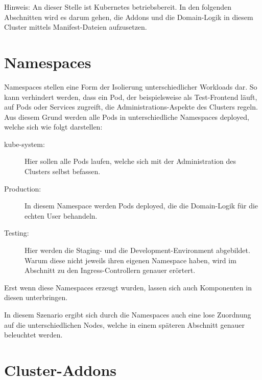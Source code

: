 \begin{tcolorbox}
  Hinweis: An dieser Stelle ist Kubernetes betriebsbereit.
  In den folgenden Abschnitten wird es darum gehen, die Addons und die
  Domain-Logik in diesem Cluster mittels Manifest-Dateien aufzusetzen.
\end{tcolorbox}

\section{Namespaces}

Namespaces stellen eine Form der Isolierung unterschiedlicher Workloads dar.
So kann verhindert werden, dass ein Pod, der beispielsweise als Test-Frontend läuft,
auf Pods oder Services zugreift, die Administrations-Aspekte des Clusters regeln.
Aus diesem Grund werden alle Pods in unterschiedliche Namespaces deployed, welche
sich wie folgt darstellen:

\begin{description}
  \item[kube-system:]
  Hier sollen alle Pods laufen, welche sich mit der Administration des
  Clusters selbst befassen.
  \item[Production:]
  In diesem Namespace werden Pods deployed, die die Domain-Logik für die echten
  User behandeln.
  \item[Testing:]
  Hier werden die Staging- und die Development-Environment abgebildet. Warum
  diese nicht jeweils ihren eigenen Namespace haben, wird im Abschnitt zu den
  Ingress-Controllern genauer erörtert.
\end{description}

Erst wenn diese Namespaces erzeugt wurden, lassen sich auch Komponenten in diesen
unterbringen.

In diesem Szenario ergibt sich durch die Namespaces auch eine lose Zuordnung auf
die unterschiedlichen Nodes, welche in einem späteren Abschnitt genauer
beleuchtet werden.

\section{Cluster-Addons}

